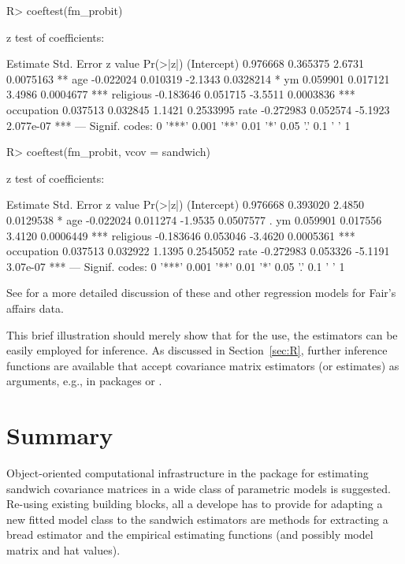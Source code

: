 \documentclass{Z}
\begin{document}
\begin{Schunk}
\begin{Sinput}
R> coeftest(fm_probit)
\end{Sinput}
\begin{Soutput}
z test of coefficients:

             Estimate Std. Error z value  Pr(>|z|)    
(Intercept)  0.976668   0.365375  2.6731 0.0075163 ** 
age         -0.022024   0.010319 -2.1343 0.0328214 *  
ym           0.059901   0.017121  3.4986 0.0004677 ***
religious   -0.183646   0.051715 -3.5511 0.0003836 ***
occupation   0.037513   0.032845  1.1421 0.2533995    
rate        -0.272983   0.052574 -5.1923 2.077e-07 ***
---
Signif. codes:  0 '***' 0.001 '**' 0.01 '*' 0.05 '.' 0.1 ' ' 1 
\end{Soutput}
\begin{Sinput}
R> coeftest(fm_probit, vcov = sandwich)
\end{Sinput}
\begin{Soutput}
z test of coefficients:

             Estimate Std. Error z value  Pr(>|z|)    
(Intercept)  0.976668   0.393020  2.4850 0.0129538 *  
age         -0.022024   0.011274 -1.9535 0.0507577 .  
ym           0.059901   0.017556  3.4120 0.0006449 ***
religious   -0.183646   0.053046 -3.4620 0.0005361 ***
occupation   0.037513   0.032922  1.1395 0.2545052    
rate        -0.272983   0.053326 -5.1191  3.07e-07 ***
---
Signif. codes:  0 '***' 0.001 '**' 0.01 '*' 0.05 '.' 0.1 ' ' 1 
\end{Soutput}
\end{Schunk}

See \cite{hac:Greene:2003} for a more detailed discussion of these and other
regression models for Fair's affairs data.

This brief illustration should merely show that for the use, the
estimators can be easily employed for inference. As discussed in Section~\ref{sec:R},
further inference functions are available that accept covariance matrix estimators
(or estimates) as arguments, e.g., in packages  or .

\section{Summary} \label{sec:summary}

Object-oriented computational infrastructure in the  package 
for estimating sandwich covariance matrices in a wide class of parametric models is suggested.
Re-using existing building blocks, all a develope has to provide for adapting
a new fitted model class to the sandwich estimators are methods for extracting a bread
estimator and the empirical estimating functions (and possibly model matrix and hat values).
\end{document}
